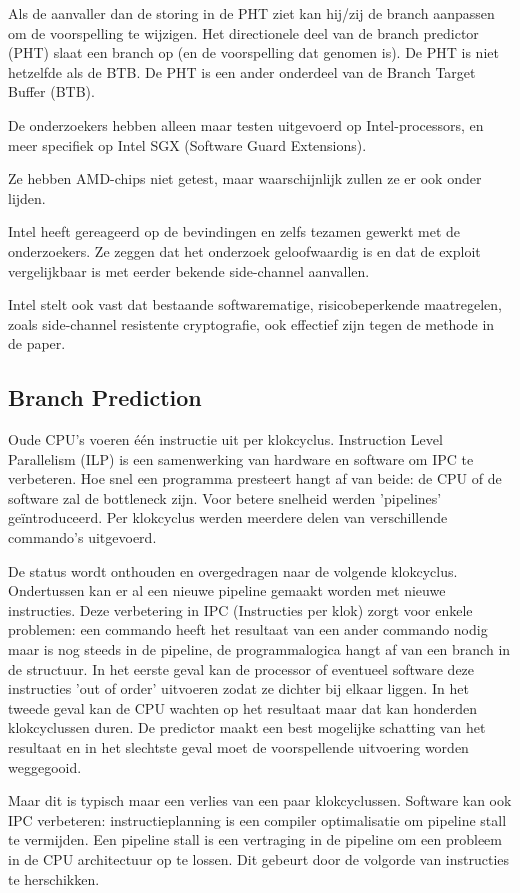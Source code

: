 Als de aanvaller dan de storing in de PHT ziet kan hij/zij de branch aanpassen om de voorspelling te wijzigen.
Het directionele deel van de branch predictor (PHT) slaat een branch op (en de voorspelling dat genomen is).
De PHT is niet hetzelfde als de BTB.
De PHT is een ander onderdeel van de Branch Target Buffer (BTB).


De onderzoekers hebben alleen maar testen uitgevoerd op Intel-processors, en meer specifiek op Intel SGX (Software Guard Extensions).

Ze hebben AMD-chips niet getest, maar waarschijnlijk zullen ze er ook onder lijden.

Intel heeft gereageerd op de bevindingen en zelfs tezamen gewerkt met de onderzoekers.
Ze zeggen dat het onderzoek geloofwaardig is en dat de exploit vergelijkbaar is met eerder bekende side-channel aanvallen.

Intel stelt ook vast dat bestaande softwarematige, risicobeperkende maatregelen, zoals side-channel resistente cryptografie, ook effectief zijn tegen de methode in de paper.

\subsection{Branch Prediction}
Oude CPU's voeren één instructie uit per klokcyclus.
Instruction Level Parallelism (ILP) is een samenwerking van hardware en software om IPC te verbeteren. Hoe snel een programma presteert hangt af van beide: de CPU of de software zal de bottleneck zijn.
Voor betere snelheid werden 'pipelines' geïntroduceerd. Per klokcyclus werden meerdere delen van verschillende commando's uitgevoerd. 

De status wordt onthouden en overgedragen naar de volgende klokcyclus. Ondertussen kan er al een nieuwe pipeline gemaakt worden met nieuwe instructies. Deze verbetering in IPC (Instructies per klok) zorgt voor enkele problemen: een commando heeft het resultaat van een ander commando nodig maar is nog steeds in de pipeline, de programmalogica hangt af van een branch in de structuur. In het eerste geval kan de processor of eventueel software deze instructies 'out of order' uitvoeren zodat ze dichter bij elkaar liggen. In het tweede geval kan de CPU wachten op het resultaat maar dat kan honderden klokcyclussen duren. De predictor maakt een best mogelijke schatting van het resultaat en in het slechtste geval moet de voorspellende uitvoering  worden weggegooid.

Maar dit is typisch maar een verlies van een paar klokcyclussen.
Software kan ook IPC verbeteren: instructieplanning is een compiler optimalisatie om pipeline stall te vermijden.
Een pipeline stall is een vertraging in de pipeline om een probleem in de CPU architectuur op te lossen.
Dit gebeurt door de volgorde van instructies te herschikken.

